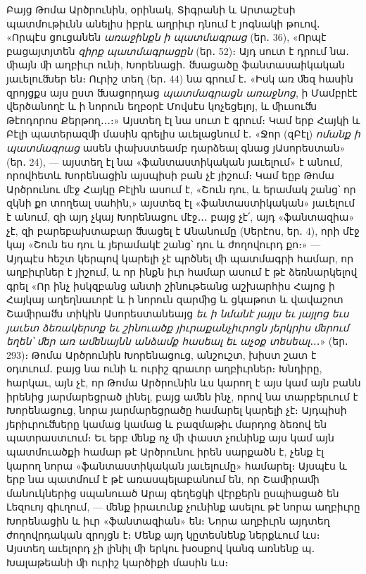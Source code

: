 \documentclass{article}
\begin{document}
{Բայց Թոմա Արծրունին, օրինակ, Տիգրանի և Արտաշէսի պատմութիւնն անելիս իբրև աղրիւր դնում է յոգնակի թուով․ «Որպէս ցուցանեն \emph{առաջինքն ի պատմագրաց} (եր․ 36), «Որպէ բացայտյտեն \emph{զիրք պատմագրացըն} (եր․ 52)։ Այդ սուտ է դրում նա․ ﬕայն ﬕ աղբիւր ունի, Խորենացի․ ﬓացածը ֆանտասաիկական յաւելուﬓեր են։ Ուրիշ տեղ (եր․ 44) նա գրում է․ «Իսկ առ ﬔզ հասին զրոյցքս այս ըստ ﬓացորդաց \emph{պատմագրացն առաջնոց}, ի Մամբրէէ վերծանողէ և ի նորուն եղբօրէ Մովսէս կոչեցելոյ, և ﬕւսուﬓ Թէոդորոս Քերթող․․․։» Այստեղ էլ նա սուտ է գրում։ Կամ երբ Հայկի և Բէլի պատերազﬕ մասին գրելիս աւելացնում է․ «Ջոր (զԲէլ) \emph{ոմանք ի պատմագրաց} ասեն փախստեամբ դարձեալ գնաց յԱսորեստան» (եր․ 24), — այստեղ էլ նա «ֆանտաստիկական յաւելում» է անում, որովհետև Խորենացին այսպիսի բան չէ յիշում։ Կամ եըբ Թոմա Արծրունու մէջ Հայկը Բէլին ասում է, «Շուն դու, և երամակ շանց՝ որ զկնի քո տողեալ սահին,» այստեզ էլ «ֆանտաստիկական» յաւելում է անում, զի այդ չկայ Խորենացու մէջ․․․ բայց չէ՛, այդ «ֆանտազիա» չէ, զի բարեբախտաբար ﬓացել է Անանումը (Սերէոս, եր․ 4), որի մէջ կայ «Շուն ես դու և յերամակէ շանց՝ դու և ժողովուրդ քո։» — Այդպէս հեշտ կերպով կարելի չէ պրծնել ﬕ պատմագրի համար, որ աղբիւրներ է յիշում, և որ ինքն իւր համար ասում է թէ ձեռնարկելով գրել «Որ ինչ իսկզբանց անտի շինութեանց աշխարհիս Հայոց ի Հայկայ աղեղնաւորէ և ի նորուն զարﬕց և ցկաթոտ և վավաշոտ Շաﬕրաﬓ տիկին Ասորեստանեայց \emph{եւ ի նմանէ յայլս եւ յայլոց եւս յաւետ ձեռակերտք եւ շինուածք յիւրաքանչիւրոցն յերկրիս ﬔրում եղեն՝ ﬔր առ աﬔնայնն անձամք հասեալ եւ աչօք տեսեալ}․․․» (եր․ 293)։ Թոմա Արծրունին Խորենացուց, անշուշտ, խիստ շատ է օդտւում․ բայց նա ունի և ուրիշ գրաւոր աղբիւրներ։ Խնդիրը, հարկաւ, այն չէ, որ Թոմա Արծրունին ևս կարող է այս կամ այն բանն իրենից յարմարեցրած լինել, բայց աﬔն ինչ, որով նա տարբերւում է Խորենացուց, նորա յարմարեցրածը համարել կարելի չէ։ Այդպիսի յերիւրուﬓերը կամաց կամաց և բազմաթիւ մարդոց ձեռով են պատրաստւում։ Եւ երբ ﬔնք ոչ ﬕ փաստ չունինք այս կամ այն պատմուածքի համար թէ Արծրունու իրեն սարքածն է, չենք էլ կարող նորա «ֆանտաստիկական յաւելումը» համարել։ Այսպէս և երբ նա պատմում է թէ առասպելաբանում են, որ Շաﬕրաﬕ մանուկներից սպանուած Արայ գեղեցկի վէրքերն ըսպիացած են Լեզուոյ գիւղում, — ﬔնք իրաւունք չունինք ասելու թէ նորա աղբիւրը Խորենացին և իւր «ֆանտազիան» են։ Նորա աղբիւրն այդտեղ ժողովրդական զրոյցն է։ Մենք այդ կըտեսնենք ներքևում ևս։ Այստեղ աւելորդ չի լինիլ ﬕ երկու խօսքով կանգ առնենք պ․ Խալաթեանի ﬕ ուրիշ կարծիքի մասին ևս։

}
\end{document}

